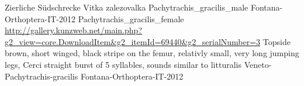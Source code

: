 {Zierliche S\"udschrecke} %
{Vitka zalezovalka} %
{} %
{Pachytrachis_gracilis_male} %
{Fontana-Orthoptera-IT-2012}%
{Pachytrachis_gracilis_female} %
{\url{http://gallery.kunzweb.net/main.php?g2_view=core.DownloadItem&g2_itemId=69440&g2_serialNumber=3}} %
{Topside brown, short winged, black stripe on the femur, relativly small, very long jumping legs, Cerci straight} %
{burst of 5 syllables, sounds similar to litturalis} %
{Veneto-Pachytrachis-gracilis} %
{Fontana-Orthoptera-IT-2012}%
